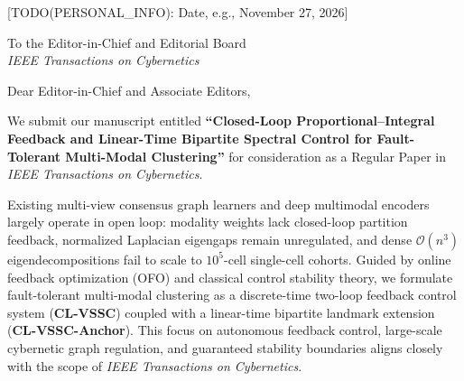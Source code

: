 \documentclass[11pt,letterpaper]{article}
\begin{document}
[TODO(PERSONAL\_INFO): Date, e.g., November 27, 2026]

\vspace{6pt}
To the Editor-in-Chief and Editorial Board\\
\textit{IEEE Transactions on Cybernetics}

\vspace{6pt}
Dear Editor-in-Chief and Associate Editors,

We submit our manuscript entitled \textbf{``Closed-Loop Proportional--Integral Feedback and Linear-Time Bipartite Spectral Control for Fault-Tolerant Multi-Modal Clustering''} for consideration as a Regular Paper in \textit{IEEE Transactions on Cybernetics}.

Existing multi-view consensus graph learners and deep multimodal encoders largely operate in open loop: modality weights lack closed-loop partition feedback, normalized Laplacian eigengaps remain unregulated, and dense $\mathcal{O}(n^3)$ eigendecompositions fail to scale to $10^5$-cell single-cell cohorts. Guided by online feedback optimization (OFO) and classical control stability theory, we formulate fault-tolerant multi-modal clustering as a discrete-time two-loop feedback control system (\textbf{CL-VSSC}) coupled with a linear-time bipartite landmark extension (\textbf{CL-VSSC-Anchor}). This focus on autonomous feedback control, large-scale cybernetic graph regulation, and guaranteed stability boundaries aligns closely with the scope of \textit{IEEE Transactions on Cybernetics}.
\end{document}
